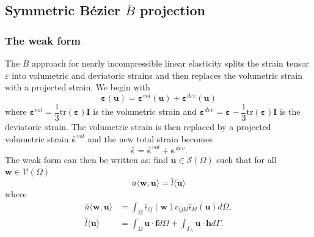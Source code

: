 \documentclass{article}
\newcommand\mi{\mathbf{I}}
\newcommand{\Bezier}{{B\'{e}zier} }
\begin{document}
\subsection{Symmetric \Bezier $\bar{B}$ projection}
\subsubsection{The weak form}
The $\bar{B}$ approach for nearly incompressible linear elasticity splits the strain tensor $\varepsilon$ into volumetric and deviatoric strains and then replaces the volumetric strain with a projected strain. We begin with
\begin{equation}
\boldsymbol{\varepsilon}(\mathbf{u})=\boldsymbol{\varepsilon}^{vol}(\mathbf{u})+\boldsymbol{\varepsilon}^{dev}(\mathbf{u})
\end{equation}
where $\boldsymbol{\varepsilon}^{vol}=\dfrac{1}{3}\mathrm{tr}(\boldsymbol{\varepsilon})\mi$ is the volumetric strain and $\boldsymbol{\varepsilon}^{dev}=\boldsymbol{\varepsilon}-\dfrac{1}{3}\mathrm{tr}(\boldsymbol{\varepsilon})\mi$ is the deviatoric strain. The volumetric strain is then replaced by a projected volumetric strain $\bar{\boldsymbol{\varepsilon}}^{vol}$ and the new total strain becomes
\begin{equation}
\bar{\boldsymbol{\varepsilon}}=\bar{\boldsymbol{\varepsilon}}^{vol}+\boldsymbol{\varepsilon}^{dev}.
\end{equation}
The weak form can then be written as: find $\mathbf{u}\in{\mathcal{S}(\Omega)}$ such that for all $\mathbf{w}\in{\mathcal{V}(\Omega)}$
\begin{equation}
    \bar{a}\langle{\mathbf{w},\mathbf{u}}\rangle=\bar{l}\langle{\mathbf{u}}\rangle
\end{equation}
where
\begin{align}
    \bar{a}\langle{\mathbf{w},\mathbf{u}}\rangle&=\int_{\Omega}\bar{\epsilon}_{ij}(\mathbf{w})c_{ijkl}\bar{\epsilon}_{kl}(\mathbf{u})d\Omega, \\
    \bar{l}\langle{\mathbf{u}}\rangle&=\int_{\Omega}\mathbf{u}\cdot\mathbf{f}d\Omega+\int_{\Gamma_{h}}\mathbf{u}\cdot\mathbf{h}d\Gamma.
\end{align}
\end{document}

